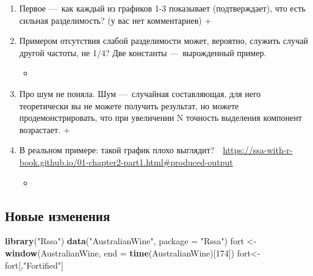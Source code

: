 \documentclass[
]{article}
\newenvironment{Shaded}{\begin{snugshade}}{\end{snugshade}}
\newcommand{\AttributeTok}[1]{\textcolor[rgb]{0.13,0.29,0.53}{#1}}
\newcommand{\DecValTok}[1]{\textcolor[rgb]{0.00,0.00,0.81}{#1}}
\newcommand{\FunctionTok}[1]{\textcolor[rgb]{0.13,0.29,0.53}{\textbf{#1}}}
\newcommand{\NormalTok}[1]{#1}
\newcommand{\OtherTok}[1]{\textcolor[rgb]{0.56,0.35,0.01}{#1}}
\newcommand{\StringTok}[1]{\textcolor[rgb]{0.31,0.60,0.02}{#1}}
\providecommand{\tightlist}{%
  \setlength{\itemsep}{0pt}\setlength{\parskip}{0pt}}
\begin{document}
\begin{enumerate}
\def\labelenumi{\arabic{enumi}.}
\tightlist
\item
  Первое ---~как каждый из графиков 1-3 показывает (подтверждает), что
  есть сильная разделимость? (у вас нет комментариев) +
\item
  Примером отсутствия слабой разделимости может, вероятно, служить
  случай другой частоты, не 1/4? Две константы ---~вырожденный пример.

  \begin{itemize}
  \tightlist
  \item
  \end{itemize}
\item
  Про шум не поняла. Шум ---~случайная составляющая, для него
  теоретически вы не можете получить результат, но можете
  продемонстрировать, что при увеличении N точность выделения компонент
  возрастает. +
\item
  В реальном примере: такой график плохо
  выглядит?~~\url{https://ssa-with-r-book.github.io/01-chapter2-part1.html\#produced-output}

  \begin{itemize}
  \tightlist
  \item
  \end{itemize}
\end{enumerate}

\subsection{Новые
изменения}\label{ux43dux43eux432ux44bux435-ux438ux437ux43cux435ux43dux435ux43dux438ux44f}

\begin{Shaded}
\begin{Highlighting}[]
\FunctionTok{library}\NormalTok{(}\StringTok{"Rssa"}\NormalTok{)}
\FunctionTok{data}\NormalTok{(}\StringTok{"AustralianWine"}\NormalTok{, }\AttributeTok{package =} \StringTok{"Rssa"}\NormalTok{)}
\NormalTok{fort }\OtherTok{\textless{}{-}} \FunctionTok{window}\NormalTok{(AustralianWine, }\AttributeTok{end =} \FunctionTok{time}\NormalTok{(AustralianWine)[}\DecValTok{174}\NormalTok{])}
\NormalTok{fort}\OtherTok{\textless{}{-}}\NormalTok{fort[,}\StringTok{"Fortified"}\NormalTok{]}
\end{Highlighting}
\end{Shaded}
\end{document}
